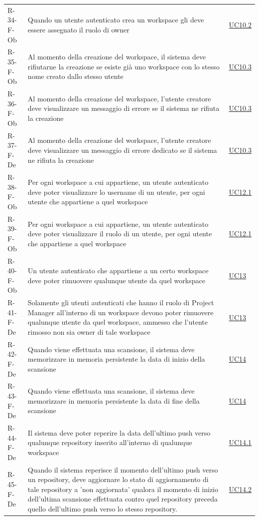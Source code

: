 \documentclass[a4paper, 11pt]{article}
\begin{document}
\begin{longtable}[c]{ >{\centering\arraybackslash}m{2.5cm} >{\centering\arraybackslash}m{8.3cm} >{\centering\arraybackslash}m{3.5cm} }
    R-34-F-Ob & Quando un utente autenticato crea un workspace gli deve essere assegnato il ruolo di owner & \hyperref[UC10.2]{UC10.2}\\
    R-35-F-Ob & Al momento della creazione del workspace, il sistema deve rifiutarne la creazione se esiste già uno workspace con lo stesso nome creato dallo stesso utente & \hyperref[UC10.3]{UC10.3}\\
    R-36-F-Ob & Al momento della creazione del workspace, l'utente creatore deve visualizzare un messaggio di errore se il sistema ne rifiuta la creazione & \hyperref[UC10.3]{UC10.3}\\
    R-37-F-De & Al momento della creazione del workspace, l'utente creatore deve visualizzare un messaggio di errore dedicato se il sistema ne rifiuta la creazione & \hyperref[UC10.3]{UC10.3}\\
    R-38-F-Ob & Per ogni workspace a cui appartiene, un utente autenticato deve poter visualizzare lo username di un utente, per ogni utente che appartiene a quel workspace & \hyperref[UC12.1]{UC12.1}\\
    R-39-F-Ob & Per ogni workspace a cui appartiene, un utente autenticato deve poter visualizzare il ruolo di un utente, per ogni utente che appartiene a quel workspace & \hyperref[UC12.1]{UC12.1}\\
    R-40-F-Ob & Un utente autenticato che appartiene a un certo workspace deve poter rimuovere qualunque utente da quel workspace & \hyperref[UC13]{UC13}\\
    R-41-F-De & Solamente gli utenti autenticati che hanno il ruolo di Project Manager all'interno di un workspace devono poter rimuovere qualunque utente da quel workspace, ammesso che l'utente rimosso non sia owner di tale workspace & \hyperref[UC13]{UC13}\\
    R-42-F-De & Quando viene effettuata una scansione, il sistema deve memorizzare in memoria persistente la data di inizio della scansione & \hyperref[UC14]{UC14}\\
    R-43-F-De & Quando viene effettuata una scansione, il sistema deve memorizzare in memoria persistente la data di fine della scansione & \hyperref[UC14]{UC14}\\
    R-44-F-De & Il sistema deve poter reperire la data dell'ultimo push verso qualunque repository inserito all'interno di qualunque workspace & \hyperref[UC14.1]{UC14.1}\\
    R-45-F-De & Quando il sistema reperisce il momento dell'ultimo push verso un repository, deve aggiornare lo stato di aggiornamento di tale repository a 'non aggiornata' qualora il momento di inizio dell'ultima scansione effettuata contro quel repository preceda quello dell'ultimo push verso lo stesso repository. & \hyperref[UC14.2]{UC14.2}\\

\end{longtable}
\end{document}
